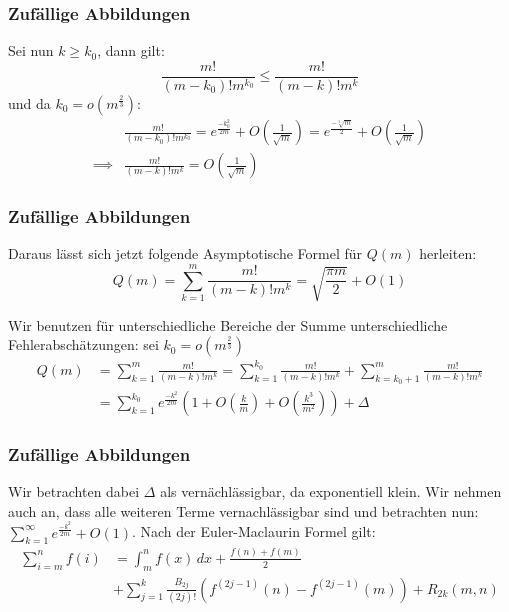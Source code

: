 \documentclass{beamer}
\begin{document}

\begin{frame}
	\frametitle{Zufällige Abbildungen}
	Sei nun \(k \geq k_0\), dann gilt:
	\[
		\frac{m!}{(m-k_0)!m^{k_0}} \leq \frac{m!}{(m-k)!m^k}
	\]
	und da \(k_0=o\left(m^{\frac{2}{3}}\right)\):
	\begin{align*}
		&\frac{m!}{(m-k_0)!m^{k_0}} = e^\frac{-k_0^2}{2m} + O\left(\frac{1}{\sqrt{m}}\right)
		= e^\frac{-\sqrt[5]{m}}{2} + O\left(\frac{1}{\sqrt{m}}\right) \\
		\implies &\frac{m!}{(m-k)!m^k} = O\left(\frac{1}{\sqrt{m}}\right)
	\end{align*}
\end{frame}

\begin{frame}
	\frametitle{Zufällige Abbildungen}
	Daraus lässt sich jetzt folgende Asymptotische Formel für \(Q(m)\) herleiten:
	\[
		Q(m)= \sum_{k=1}^m \frac{m!}{(m-k)!m^k} = \sqrt{\frac{\pi m}{2}} + O(1)
	\]

	Wir benutzen für unterschiedliche Bereiche der Summe unterschiedliche Fehlerabschätzungen: sei \(k_0=o\left( m^{\frac{2}{3}}\right)\)
	\begin{align*}
		Q(m)&= \sum_{k=1}^m \frac{m!}{(m-k)!m^k}
		= \sum_{k=1}^{k_0} \frac{m!}{(m-k)!m^k}
		+ \sum_{k=k_0+1}^{m} \frac{m!}{(m-k)!m^k} \\	
		&= \sum_{k=1}^{k_0} e^{\frac{-k^2}{2m}} \left( 1 + O\left(\frac{k}{m}\right) + O\left(\frac{k^3}{m^2}\right) \right)+ \Delta
	\end{align*}
\end{frame}


\begin{frame}
	\frametitle{Zufällige Abbildungen}
	Wir betrachten dabei \(\Delta\) als vernächlässigbar, da exponentiell klein.
	Wir nehmen auch an, dass alle weiteren Terme vernachlässigbar sind und betrachten nun:
	\( \sum_{k=1}^{\infty} e^{\frac{-k^2}{2m}} + O(1)\).
	Nach der Euler-Maclaurin Formel gilt:
	\begin{align*}
		\sum_{i = m}^{n} f(i) &= \int_{m}^{n} f(x) \,dx 
		+ \frac{f(n) + f(m)}{2}\\
		&+ \sum_{j = 1}^{k} \frac{B_{2j}}{(2j)!} \left( f^{(2j-1)}(n) - f^{(2j-1)}(m) \right) + R_{2k}(m,n)
	\end{align*}
\end{frame}
\end{document}
